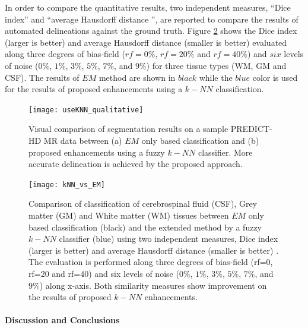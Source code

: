 In  order  to  compare  the  quantitative  results, two independent measures, ``Dice index'' and ``average Hausdorff distance \cite{Dubuisson1994}'', are reported to compare the results of automated delineations against the ground truth. Figure \ref{kNN_vs_EM} shows the Dice index (larger is better) and average Hausdorff distance (smaller is better) evaluated along three degrees of bias-field ($rf=0\%$, $rf=20\%$ and $rf=40\%$) and $six$ levels of noise ($0\%$, $1\%$, $3\%$, $5\%$, $7\%$, and $9\%$) for three tissue types (WM, GM and CSF). The results of $EM$ method are shown in $black$ while the $blue$ color is used for the results of proposed enhancements using a $k-NN$ classification.

\begin{figure}
\centering
\texttt{[image: useKNN\_qualitative]}\
\centering
\caption{Visual comparison of segmentation results on a sample PREDICT-HD MR data between (a) $EM$ only based classification and (b) proposed enhancements using a fuzzy $k-NN$ classifier. More accurate delineation is achieved by the proposed approach.}
\label{useKNN_qualitative}
\end{figure}

\begin{figure}
\centering
\texttt{[image: kNN\_vs\_EM]}\
\centering
\caption{Comparison of classification of cerebrospinal fluid (CSF), Grey matter (GM) and White matter (WM) tissues between $EM$ only based classification (black) and the extended method by a fuzzy $k-NN$ classifier (blue) using two independent measures, Dice index (larger is better) and average Hausdorff distance (smaller is better) . The evaluation is performed along three degrees of bias-field (rf=0, rf=20 and rf=40) and six levels of noise ($0\%$, $1\%$, $3\%$, $5\%$, $7\%$, and $9\%$) along x-axis. Both similarity measures show improvement on the results of proposed $k-NN$ enhancements.}
\label{kNN_vs_EM}
\end{figure}

\paragraph{Discussion and Conclusions} %

